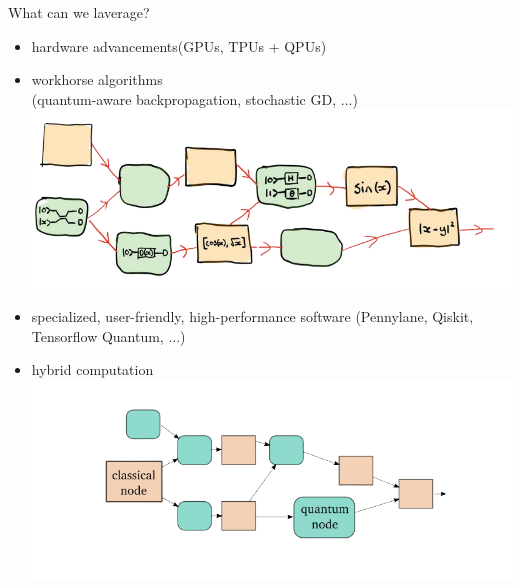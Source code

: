\begin{frame}{What can we laverage?}
	\begin{itemize}
		\item hardware advancements(GPUs, TPUs + \alert{QPUs})
		\item 
		workhorse algorithms\\ (\alert{quantum-aware} backpropagation, stochastic GD, ...)
		\includegraphics[width=.6\linewidth]{qbackprop}
%		
		
		
		
		\item specialized, user-friendly, high-performance software (Pennylane, Qiskit, Tensorflow Quantum, ...)
		
		\item 
		\alert{hybrid} computation\\
		\includegraphics[width=.7\linewidth]{hybrid}
		
	\end{itemize}
\end{frame}